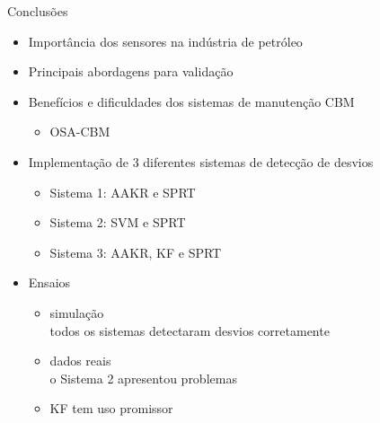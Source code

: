 \documentclass{beamer}
\begin{document}
\begin{frame}{Conclusões}

    \begin{itemize}
        \item Importância dos sensores na indústria de petróleo
        \item Principais abordagens para validação
        \item Benefícios e dificuldades dos sistemas de manutenção CBM
            \begin{itemize}
                \item OSA-CBM
            \end{itemize}
        \item Implementação de 3 diferentes sistemas de detecção de desvios
            \begin{itemize}
                \item Sistema 1: AAKR e SPRT
                \item Sistema 2: SVM e SPRT
                \item Sistema 3: AAKR, KF e SPRT
            \end{itemize}
        \item Ensaios
            \begin{itemize}
                \item simulação\\
                    todos os sistemas detectaram desvios corretamente
                \item dados reais\\
                    o Sistema 2 apresentou problemas
                \item KF tem uso promissor
            \end{itemize}
    \end{itemize}

    
\end{frame}
\end{document}
